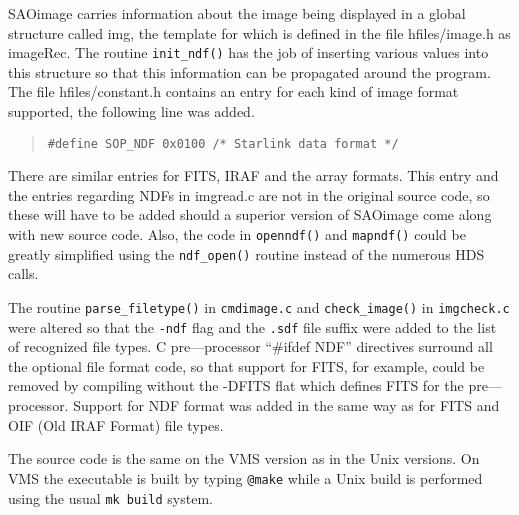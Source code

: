 SAOimage carries information about the image being displayed in a global
structure called img, the template for which is defined in the file
hfiles/image.h as imageRec. The routine {\tt init\_ndf()} has the job of
inserting various values into this structure so that this information can
be propagated around the program. The file hfiles/constant.h contains an 
entry for
each kind of image format supported, the following line was added.
\begin{quote}
{\tt \#define SOP\_NDF         0x0100          /* Starlink data format */}
\end{quote}
There are similar entries for FITS, IRAF and the array formats. This
entry and the entries regarding NDFs in imgread.c are not in the original
source code, so these will have to be added should a superior version of
SAOimage come along with new source code. Also, the code in {\tt openndf()} 
and
{\tt mapndf()} could be greatly simplified using the {\tt ndf\_open()} 
routine instead of
the numerous HDS calls.

The routine {\tt parse\_filetype()} in {\tt cmdimage.c} and 
{\tt check\_image()} in
{\tt imgcheck.c} were altered so that the {\tt -ndf} flag and the {\tt .sdf} 
file
suffix were added to the list of recognized file types. C
pre---processor ``\#ifdef NDF'' directives surround all the optional file
format code, so that support for FITS, for example, could be removed
by compiling without the -DFITS flat which defines FITS for the
pre---processor. Support for NDF format was added in the same way as
for FITS and OIF (Old IRAF Format) file types.

The source code is the same on the VMS version as in the Unix
versions. On VMS the executable is built by typing {\tt @make} while a
Unix build is performed using the usual {\tt mk build} system.


